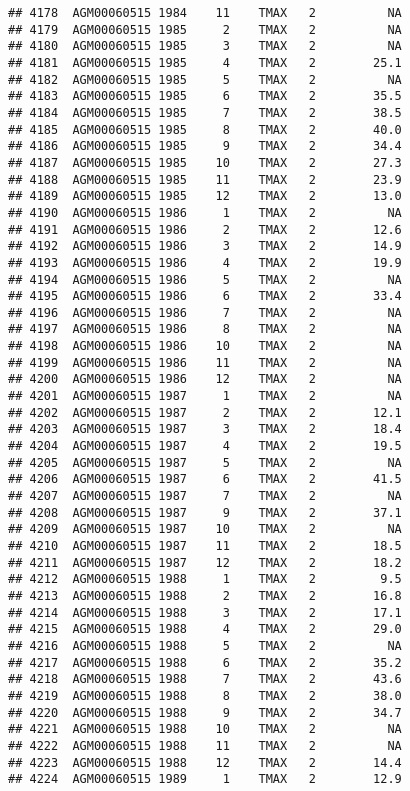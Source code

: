 \documentclass{article}\usepackage[]{graphicx}\usepackage[]{color}
\makeatletter
\newenvironment{kframe}{%
 \def\at@end@of@kframe{}%
 \ifinner\ifhmode%
  \def\at@end@of@kframe{\end{minipage}}%
  \begin{minipage}{\columnwidth}%
 \fi\fi%
 \def\FrameCommand##1{\hskip\@totalleftmargin \hskip-\fboxsep
 \colorbox{shadecolor}{##1}\hskip-\fboxsep
     \hskip-\linewidth \hskip-\@totalleftmargin \hskip\columnwidth}%
 \MakeFramed {\advance\hsize-\width
   \@totalleftmargin\z@ \linewidth\hsize
   \@setminipage}}%
 {\par\unskip\endMakeFramed%
 \at@end@of@kframe}
\newenvironment{knitrout}{}{} %
\makeatother
\begin{document}
\begin{knitrout}
\begin{kframe}
\begin{verbatim}
## 4178  AGM00060515 1984    11    TMAX   2          NA
## 4179  AGM00060515 1985     2    TMAX   2          NA
## 4180  AGM00060515 1985     3    TMAX   2          NA
## 4181  AGM00060515 1985     4    TMAX   2        25.1
## 4182  AGM00060515 1985     5    TMAX   2          NA
## 4183  AGM00060515 1985     6    TMAX   2        35.5
## 4184  AGM00060515 1985     7    TMAX   2        38.5
## 4185  AGM00060515 1985     8    TMAX   2        40.0
## 4186  AGM00060515 1985     9    TMAX   2        34.4
## 4187  AGM00060515 1985    10    TMAX   2        27.3
## 4188  AGM00060515 1985    11    TMAX   2        23.9
## 4189  AGM00060515 1985    12    TMAX   2        13.0
## 4190  AGM00060515 1986     1    TMAX   2          NA
## 4191  AGM00060515 1986     2    TMAX   2        12.6
## 4192  AGM00060515 1986     3    TMAX   2        14.9
## 4193  AGM00060515 1986     4    TMAX   2        19.9
## 4194  AGM00060515 1986     5    TMAX   2          NA
## 4195  AGM00060515 1986     6    TMAX   2        33.4
## 4196  AGM00060515 1986     7    TMAX   2          NA
## 4197  AGM00060515 1986     8    TMAX   2          NA
## 4198  AGM00060515 1986    10    TMAX   2          NA
## 4199  AGM00060515 1986    11    TMAX   2          NA
## 4200  AGM00060515 1986    12    TMAX   2          NA
## 4201  AGM00060515 1987     1    TMAX   2          NA
## 4202  AGM00060515 1987     2    TMAX   2        12.1
## 4203  AGM00060515 1987     3    TMAX   2        18.4
## 4204  AGM00060515 1987     4    TMAX   2        19.5
## 4205  AGM00060515 1987     5    TMAX   2          NA
## 4206  AGM00060515 1987     6    TMAX   2        41.5
## 4207  AGM00060515 1987     7    TMAX   2          NA
## 4208  AGM00060515 1987     9    TMAX   2        37.1
## 4209  AGM00060515 1987    10    TMAX   2          NA
## 4210  AGM00060515 1987    11    TMAX   2        18.5
## 4211  AGM00060515 1987    12    TMAX   2        18.2
## 4212  AGM00060515 1988     1    TMAX   2         9.5
## 4213  AGM00060515 1988     2    TMAX   2        16.8
## 4214  AGM00060515 1988     3    TMAX   2        17.1
## 4215  AGM00060515 1988     4    TMAX   2        29.0
## 4216  AGM00060515 1988     5    TMAX   2          NA
## 4217  AGM00060515 1988     6    TMAX   2        35.2
## 4218  AGM00060515 1988     7    TMAX   2        43.6
## 4219  AGM00060515 1988     8    TMAX   2        38.0
## 4220  AGM00060515 1988     9    TMAX   2        34.7
## 4221  AGM00060515 1988    10    TMAX   2          NA
## 4222  AGM00060515 1988    11    TMAX   2          NA
## 4223  AGM00060515 1988    12    TMAX   2        14.4
## 4224  AGM00060515 1989     1    TMAX   2        12.9

\end{verbatim}
\end{kframe}
\end{knitrout}
\end{document}
